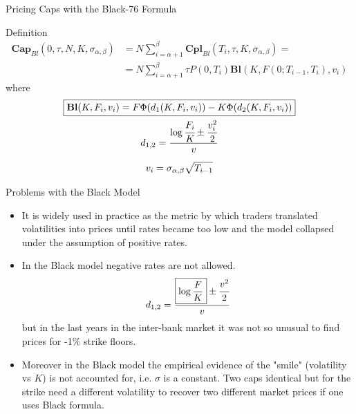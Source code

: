 \documentclass{beamer}
\begin{document}
\begin{frame}{Pricing Caps with the Black-76 Formula}
	\begin{block}{Definition}
		\begin{equation}
			\begin{aligned}
				\textbf{Cap}_{Bl}(0, \tau,N,K,\sigma_{\alpha,\beta}) &= N\sum_{i=\alpha+1}^{\beta}\textbf{Cpl}_{Bl}(T_i, \tau,K,\sigma_{\alpha,\beta}) = \\ &=N\sum_{i=\alpha+1}^{\beta}\tau P(0,T_i) \textbf{Bl}(K,F(0;T_{i-1},T_i),v_i)
			\end{aligned}
			\label{eq:cap_black}
		\end{equation}
		where
		\begin{equation*}
			\begin{gathered}
				\boxed{\textbf{Bl}(K,F_i,v_i)=F\Phi(d_1(K,F_i,v_i)) - K\Phi(d_2(K,F_i,v_i))} \\
				d_{1,2} = \frac{\log{\cfrac{F_i}{K}} \pm \cfrac{v_i^2}{2}}{v} \\[0.2cm]
				v_i = \sigma_{\alpha,\beta}\sqrt{T_{i-1}}
			\end{gathered}
		\end{equation*}
	\end{block}
\end{frame}

\begin{frame}{Problems with the Black Model}
	\begin{itemize}
		\item It is widely used in practice as the metric by which traders translated volatilities into prices until rates became too low and the model collapsed under the assumption of positive rates.
		\item In the Black model \textcolor{maincolor}{negative rates are not allowed}.
		\begin{equation*}
			d_{1,2} = \frac{\boxed{\log{\frac{F}{K}}} \pm \cfrac{v^2}{2}}{v}
		\end{equation*}
		but in the last years in the inter-bank market it was not so unusual to find prices for -1\% strike floors.
		\item Moreover in the Black model the empirical evidence of the "smile" (volatility vs $K$) is not accounted for, i.e. $\sigma$ is a constant. Two caps identical but for the strike need a different volatility to recover two different market prices if one uses Black formula.
		
		
	\end{itemize}
\end{frame}
\end{document}
